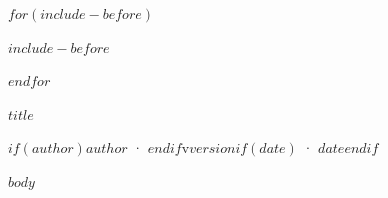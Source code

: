 \documentclass[10pt,a4paper]{article}
\begin{document}
\thispagestyle{firstpage}

\null\vfill

$for(include-before)$
\begin{center}
\begin{varwidth}{\textwidth}
$include-before$
\end{varwidth}
\end{center}
$endfor$

\vfill

{\fontsize{16pt}{19pt}\selectfont\bfseries $title$\par}
{\fontsize{9pt}{11pt}\selectfont\color{secondarytext}%
$if(author)$$author$ · $endif$v$version$$if(date)$ · $date$$endif$\par}

\tableofcontents
\thispagestyle{firstpage}

\vspace{6em}

\newpage

$body$
\end{document}
